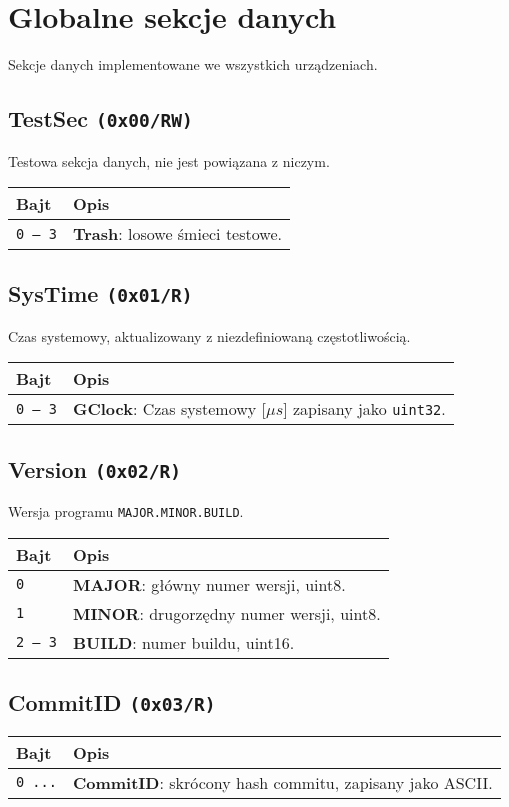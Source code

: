 \section{Globalne sekcje danych}
\label{Sec_GlobalneSekcjeDanych}
Sekcje danych implementowane we wszystkich urządzeniach.

\subsection{TestSec \texttt{(0x00/RW)}}
\label{TestSec}
Testowa sekcja danych, nie jest powiązana z niczym.
\begin{longtable}{|p{\BWIDTH}|p{\OWIDTH}|}
	\hline
	\textbf{Bajt} & \textbf{Opis}\\ 
	\hline
	\hline
	\texttt{0 -- 3} & \textbf{Trash}: losowe śmieci testowe.\\
	\hline
\end{longtable}

\subsection{SysTime \texttt{(0x01/R)}}
\label{SysTime}
Czas systemowy, aktualizowany z niezdefiniowaną częstotliwością.
\begin{longtable}{|p{\BWIDTH}|p{\OWIDTH}|}
	\hline
	\textbf{Bajt} & \textbf{Opis}\\ 
	\hline
	\hline
	\texttt{0 -- 3} & \textbf{GClock}: Czas systemowy [$\mu s$] zapisany jako \texttt{uint32}.\\
	\hline
\end{longtable}

\subsection{Version \texttt{(0x02/R)}}
\label{Version}
Wersja programu \texttt{MAJOR.MINOR.BUILD}.
\begin{longtable}{|p{\BWIDTH}|p{\OWIDTH}|}
	\hline
	\textbf{Bajt} & \textbf{Opis}\\ 
	\hline
	\hline
	\texttt{0} & \textbf{MAJOR}: główny numer wersji, uint8.\\
	\hline
	\texttt{1} & \textbf{MINOR}: drugorzędny numer wersji, uint8.\\
	\hline
	\texttt{2 -- 3} & \textbf{BUILD}: numer buildu, uint16.\\
	\hline
\end{longtable}

\subsection{CommitID \texttt{(0x03/R)}}
\label{CommitID}
\begin{longtable}{|p{\BWIDTH}|p{\OWIDTH}|}
\hline
\textbf{Bajt} & \textbf{Opis}\\ 
\hline
\hline
\texttt{0 ...} & \textbf{CommitID}: skrócony hash commitu, zapisany jako ASCII.\\
\hline
\end{longtable}

